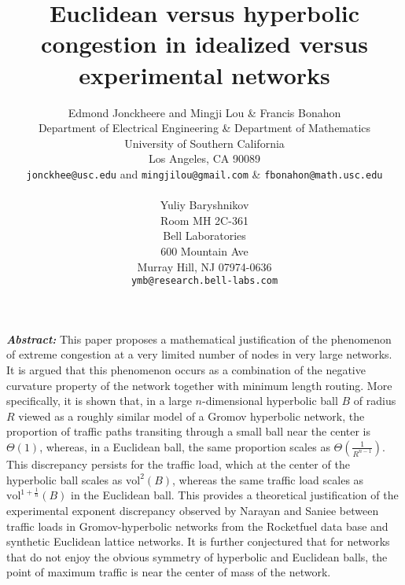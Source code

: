 \documentclass{article}
\newcommand{\vol}{\mathrm{vol}}
\begin{document}
\title{Euclidean versus hyperbolic congestion in idealized versus experimental networks}



\author{Edmond Jonckheere and Mingji Lou \& Francis Bonahon \\
Department of Electrical Engineering \& Department of Mathematics\\
University of Southern California \\
Los Angeles, CA 90089\\
{\tt jonckhee@usc.edu} and {\tt mingjilou@gmail.com} \& {\tt fbonahon@math.usc.edu}\\
\\
Yuliy Baryshnikov\\
Room MH 2C-361\\
Bell Laboratories\\
600 Mountain Ave\\
Murray Hill, NJ 07974-0636\\
{\tt ymb@research.bell-labs.com}\\
}
\maketitle
\noindent 

\noindent 

\noindent \textbf{\textit{Abstract: }}This paper proposes a mathematical justification of the phenomenon of extreme congestion at a very limited number of nodes in very large networks. It is argued that this phenomenon occurs as a combination of the negative curvature property of the network together with minimum length routing. More specifically, it is shown that, 
in a large $n$-dimensional hyperbolic ball $B$ of radius $R$ viewed as a roughly similar model of a Gromov hyperbolic network, 
the proportion of traffic paths transiting through a small ball near the center is $\Theta(1)$, 
whereas, in a Euclidean ball, the same proportion scales as $\Theta\left(\frac{1}{R^{n-1}}\right)$. 
This discrepancy persists for the traffic load, 
which at the center of the hyperbolic ball scales as $\vol^{2}(B)$, 
whereas the same traffic load scales as $\vol^{1+\frac{1}{n}}(B)$ in the Euclidean ball. 
This provides a theoretical justification of the experimental exponent discrepancy observed by Narayan and Saniee 
between traffic loads in Gromov-hyperbolic networks from the Rocketfuel data base and synthetic Euclidean lattice networks. 
It is further conjectured that for networks that do not enjoy the obvious symmetry of hyperbolic and Euclidean balls, 
the point of maximum traffic is near the center of mass of the network.
\end{document}
